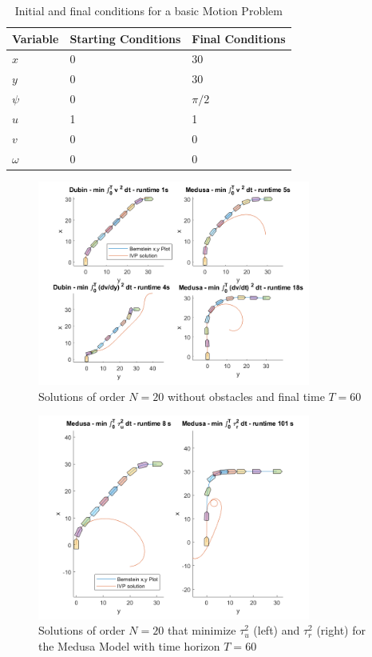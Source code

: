 \begin{table}[h!]
\centering
\begin{tabular}{|l|l|l|}
\hline
Variable & Starting Conditions & Final Conditions \\ \hline
$x$ & 0 & 30 \\
$y$ & 0 & 30 \\
$\psi$ & 0 & $\pi/2$ \\
$u$ & 1 & 1 \\
$v$ & 0 & 0 \\
$\omega$ & 0 & 0 \\
\hline
\end{tabular}
\caption{Initial and final conditions for a basic Motion Problem}
\label{tab:firstproblem}
\end{table}


\begin{figure}[h!]
\centering
\includegraphics[width=0.8\textwidth]{Images/results/noostaclesfigures.png}
\caption{Solutions of order $N=20$ without obstacles and final time $T=60$}
\label{fig:noobstaclesfigures}
\end{figure}

\begin{figure}[h!]
\centering
\includegraphics[width=0.8\textwidth]{Images/results/noostaclesmedusa.png}
\caption{Solutions of order $N=20$ that minimize $\tau_u^2$ (left) and $\tau_r^2$ (right) for the Medusa Model with time horizon $T=60$}
\label{fig:noobstaclesmedusa}
\end{figure}

